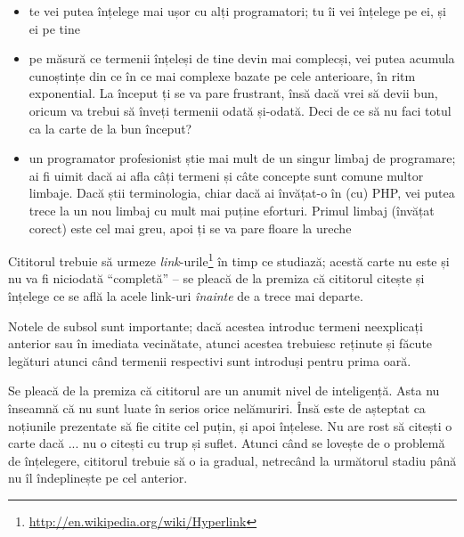 \begin{itemize}

    \item te vei putea înțelege mai ușor cu alți programatori; tu îi vei
    înțelege pe ei, și ei pe tine

    \item pe măsură ce termenii înțeleși de tine devin mai complecși, vei putea
    acumula cunoștințe din ce în ce mai complexe bazate pe cele anterioare, în
    ritm exponential. La început ți se va pare frustrant, însă dacă vrei să
    devii bun, oricum va trebui să înveți termenii odată și-odată. Deci de ce
    să nu faci totul ca la carte de la bun început?

    \item un programator profesionist știe mai mult de un singur limbaj de
    programare; ai fi uimit dacă ai afla câți termeni și câte concepte sunt
    comune multor limbaje. Dacă știi terminologia, chiar dacă ai învățat-o în
    (cu) PHP, vei putea trece la un nou limbaj cu mult mai puține eforturi.
    Primul limbaj (învățat corect) este cel mai greu, apoi ți se va pare floare
    la ureche

\end{itemize}


Cititorul trebuie să urmeze
\textsl{link}-urile\footnote{\url{http://en.wikipedia.org/wiki/Hyperlink}}
în timp ce
studiază; acestă carte nu este și nu va fi niciodată ``completă'' -- se pleacă
de la premiza că cititorul citește și înțelege ce se află la acele link-uri
\textit{înainte} de a trece mai departe.

Notele de subsol sunt importante; dacă acestea introduc termeni neexplicați
anterior sau în imediata vecinătate, atunci acestea trebuiesc reținute și
făcute legături atunci când termenii respectivi sunt introduși pentru prima
oară.

Se pleacă de la premiza că cititorul are un anumit nivel de inteligență. Asta
nu înseamnă că nu sunt luate în serios orice nelămuriri. Însă este de așteptat
ca noțiunile prezentate să fie citite cel puțin, și apoi înțelese. Nu are rost
să citești o carte dacă ... nu o citești cu trup și suflet. Atunci când se
lovește de o problemă de înțelegere, cititorul trebuie să o ia gradual,
netrecând la următorul stadiu până nu îl îndeplinește pe cel anterior.

